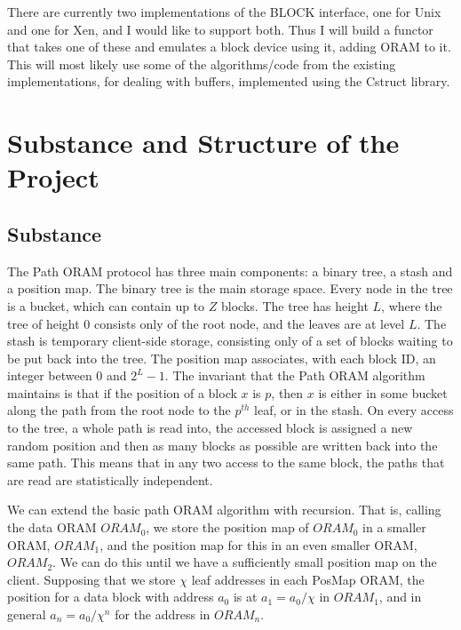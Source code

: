 \documentclass[12pt,a4paper,twoside]{article}
\begin{document}
There are currently two implementations of the BLOCK interface, one for Unix and one for Xen, and I would like to support both. Thus I will build a functor that takes one of these and emulates a block device using it, adding ORAM to it. This will most likely use some of the algorithms/code from the existing implementations, for dealing with buffers, implemented using the Cstruct library.

\section*{Substance and Structure of the Project}

\subsection*{Substance}

The Path ORAM protocol has three main components: a binary tree, a stash and a position map. The binary tree is the main storage space. Every node in the tree is a bucket, which can contain up to $Z$ blocks. The tree has height $L$, where the tree of height 0 consists only of the root node, and the leaves are at level $L$. The stash is temporary client-side storage, consisting only of a set of blocks waiting to be put back into the tree. The position map associates, with each block ID, an integer between 0 and $2^L-1$. The invariant that the Path ORAM algorithm maintains is that if the position of a block $x$ is $p$, then $x$ is either in some bucket along the path from the root node to the $p^{th}$ leaf, or in the stash. On every access to the tree, a whole path is read into, the accessed block is assigned a new random position and then as many blocks as possible are written back into the same path. This means that in any two access to the same block, the paths that are read are statistically independent.

We can extend the basic path ORAM algorithm with recursion. That is, calling the data ORAM $ORAM_0$, we store the position map of $ORAM_0$ in a smaller ORAM, $ORAM_1$, and the position map for this in an even smaller ORAM, $ORAM_2$. We can do this until we have a sufficiently small position map on the client. Supposing that we store $\chi$ leaf addresses in each PosMap ORAM, the position for a data block with address $a_0$ is at $a_1 = a_0 / \chi$ in $ORAM_1$, and in general $a_n = a_0 / \chi^n$ for the address in $ORAM_n$. 
\end{document}

